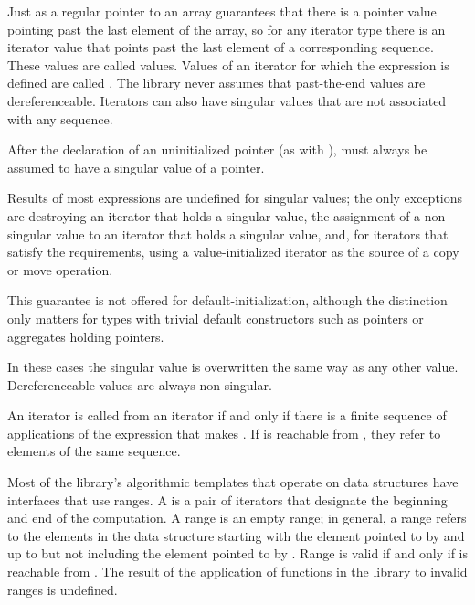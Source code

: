 \pnum
Just as a regular pointer to an array guarantees that there is a pointer value pointing past the last element
of the array, so for any iterator type there is an iterator value that points past the last element of a
corresponding sequence.
These values are called
values.
Values of an iterator
for which the expression
is defined are called
.
The library never assumes that past-the-end values are dereferenceable.
Iterators can also have singular values that are not associated with any
sequence.
\begin{example}
After the declaration of an uninitialized pointer
(as with
),
must always be assumed to have a singular value of a pointer.
\end{example}
Results of most expressions are undefined for singular values;
the only exceptions are destroying an iterator that holds a singular value,
the assignment of a non-singular value to
an iterator that holds a singular value, and, for iterators that satisfy the
 requirements, using a value-initialized iterator
as the source of a copy or move operation. \begin{note} This guarantee is not
offered for default-initialization, although the distinction only matters for types
with trivial default constructors such as pointers or aggregates holding pointers.
\end{note}
In these cases the singular
value is overwritten the same way as any other value.
Dereferenceable
values are always non-singular.

\pnum
An iterator
is called
from an iterator
if and only if there is a finite sequence of applications of
the expression
that makes
.
If
is reachable from
,
they refer to elements of the same sequence.

\pnum
Most of the library's algorithmic templates that operate on data structures have interfaces that use ranges.
A
is a pair of iterators that designate the beginning and end of the computation.
A range 
is an empty range;
in general, a range 
refers to the elements in the data structure starting with the element
pointed to by
and up to but not including the element pointed to by
.
Range 
is valid if and only if
is reachable from
.
The result of the application of functions in the library to invalid ranges is
undefined.

